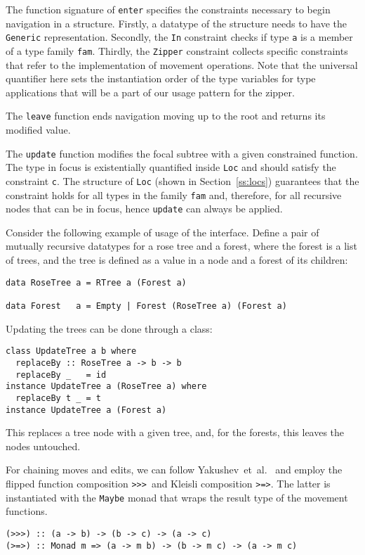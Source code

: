\documentclass[runningheads]{llncs}
\newcommand{\K}[1]{\lstinline{#1}}
\begin{document}
The function signature of \K{enter} specifies the constraints necessary to begin navigation in a structure. Firstly, a datatype of the structure needs to have the \K{Generic} representation. Secondly, the \K{In} constraint checks if type \K{a} is a member of a type family \K{fam}. Thirdly, the \K{Zipper} constraint collects specific constraints that refer to the implementation of movement operations. Note that the universal quantifier here sets the instantiation order of the type variables for type applications that will be a part of our usage pattern for the zipper. 

The \K{leave} function ends navigation moving up to the root and returns its modified value. 

The \K{update} function modifies the focal subtree with a given constrained function. The type in focus is existentially quantified inside \K{Loc} and should satisfy the constraint \K{c}. The structure of \K{Loc} (shown in Section~\ref{ss:locs}) guarantees that the constraint holds for all types in the family \K{fam} and, therefore, for all recursive nodes that can be in focus, hence \K{update} can always be applied.

Consider the following example of usage of the interface. Define a pair of mutually recursive datatypes for a rose tree and a forest, where the forest is a list of trees, and the tree is defined as a value in a node and a forest of its children:
\begin{lstlisting}
data RoseTree a = RTree a (Forest a)

data Forest   a = Empty | Forest (RoseTree a) (Forest a)
\end{lstlisting}

Updating the trees can be done through a class:
\begin{lstlisting}
class UpdateTree a b where
  replaceBy :: RoseTree a -> b -> b
  replaceBy _   = id
instance UpdateTree a (RoseTree a) where
  replaceBy t _ = t
instance UpdateTree a (Forest a)
\end{lstlisting}
This replaces a tree node with a given tree, and, for the forests, this leaves the nodes untouched.

For chaining moves and edits, we can follow Yakushev~et~al.~\cite{MuRec2009} and employ  the flipped function composition \K{>>>}~and Kleisli composition \K{>=>}. The latter is instantiated with the \K{Maybe} monad that wraps the result type of the movement functions.
\begin{lstlisting}
(>>>) :: (a -> b) -> (b -> c) -> (a -> c)
(>=>) :: Monad m => (a -> m b) -> (b -> m c) -> (a -> m c)
\end{lstlisting}
\end{document}
